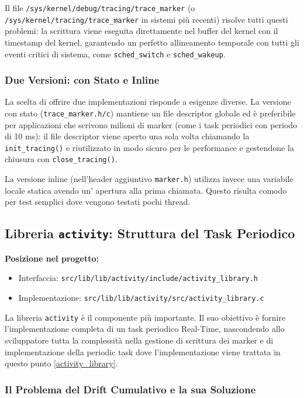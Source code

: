 Il file \texttt{/sys/kernel/debug/tracing/trace\_marker}
 (o \texttt{/sys/kernel/tracing/trace\_marker} in sistemi più recenti)
  risolve tutti questi problemi: la scrittura viene eseguita direttamente nel buffer del kernel con il timestamp del kernel, garantendo un perfetto allineamento temporale con tutti gli eventi critici di sistema, come \texttt{sched\_switch} e \texttt{sched\_wakeup}.

\subsubsection{Due Versioni: con Stato e Inline}

La scelta di offrire due implementazioni risponde a esigenze diverse.
La versione con stato (\texttt{trace\_marker.h/c}) mantiene un file descriptor globale ed è preferibile per applicazioni che scrivono milioni di marker (come i task periodici con periodo di 10 ms): il file descriptor viene aperto una sola volta chiamando la \texttt{init\_tracing()} e riutilizzato in modo sicuro per le performance e gestendone la chiusura con \texttt{close\_tracing()}. 

La versione inline (nell'header aggiuntivo \texttt{marker.h}) utilizza invece una variabile locale statica avendo un' apertura alla prima chiamata. Questo risulta comodo per test semplici dove vengono testati pochi thread.


\subsection{Libreria \texttt{activity}: Struttura del Task Periodico}
\label{sec:lib_activity}

\noindent\textbf{Posizione nel progetto:}
\begin{itemize}
	\item Interfaccia: \texttt{src/lib/lib/activity/include/activity\_library.h}
	\item Implementazione: \texttt{src/lib/lib/activity/src/activity\_library.c}
\end{itemize}

La libreria \texttt{activity} è il componente più importante. Il suo obiettivo è fornire l'implementazione completa di un task periodico Real-Time, nascondendo allo sviluppatore tutta la complessità nella gestione di scrittura dei marker e di implementazione della periodic task dove l'implementazione viene trattata in questo punto \ref{activity_library}.

\subsubsection{Il Problema del Drift Cumulativo e la sua Soluzione}

